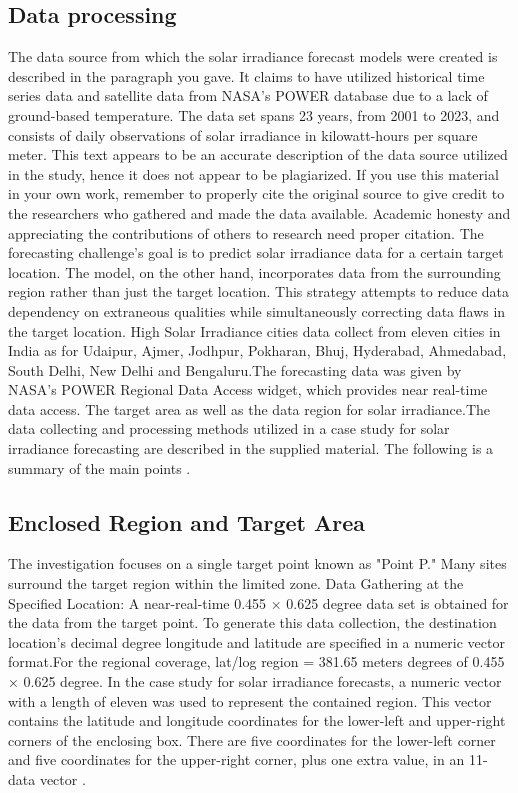 \documentclass[a4paper,fleqn]{cas-sc}
\begin{document}
\subsection{Data processing}
The data source from which the solar irradiance forecast models were created is described in the paragraph you
gave. It claims to have utilized historical time series data and satellite data from NASA’s POWER database due to a lack of ground-based temperature. The data set spans 23 years, from 2001 to 2023, and consists of daily observations of solar irradiance in kilowatt-hours per square meter. This text appears to be an accurate description of the data source utilized in the study, hence it does not appear to be plagiarized. If you use this material in your own work, remember to properly cite the original source to give credit to the researchers who gathered and made the data available. Academic honesty and appreciating the contributions of others to research need proper citation. The forecasting challenge’s goal is to predict solar irradiance data for a certain target location. The model, on the other hand, incorporates data from the surrounding region rather than just the target location. This strategy attempts to reduce data dependency on extraneous qualities while simultaneously correcting data flaws in the target location. High Solar Irradiance cities data collect from eleven cities in India as for Udaipur, Ajmer, Jodhpur, Pokharan, Bhuj, Hyderabad, Ahmedabad, South Delhi, New Delhi and Bengaluru.The forecasting data was given by NASA’s POWER Regional Data Access widget, which provides near real-time data access. The target area as well as the data region for solar irradiance.The data collecting and processing methods utilized in a case study for solar irradiance forecasting are described in the supplied material. The following is a summary of the main points \cite{brahma2020solar}.

\subsection{Enclosed Region and Target Area}
The investigation focuses on a single target point known as "Point P." Many sites surround the target region within the limited zone. Data Gathering at the Specified Location: A near-real-time 0.455 × 0.625 degree data set is obtained for the data from the target point. To generate this data collection, the destination location’s decimal degree longitude and latitude are specified in a numeric vector format.For the regional coverage, lat/log region = 381.65 meters degrees of 0.455 × 0.625 degree. In the case study for solar irradiance forecasts, a numeric vector with a length of eleven was used to represent the contained region. This vector contains the latitude and longitude coordinates for the lower-left and upper-right corners of the enclosing box. There are five coordinates for the lower-left corner and five coordinates for the upper-right corner, plus one extra value, in an 11-data vector \cite{belmahdi2020one}.
\end{document}
